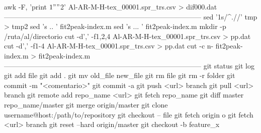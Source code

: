awk -F, '{print $1 " " $2}' Al-AR-M-H-tex_00001.spr_trs.csv > dif000.dat
------------------------------------------------------------------------------------
sed '1s/^.//' tmp > tmp2
sed 's ..  ' fit2peak-index.m
sed 's ...  ' fit2peak-index.m
mkdir -p /ruta/al/directorio
cut -d',' -f1,2,4 Al-AR-M-H-tex_00001.spr_trs.csv > pp.dat
cut -d',' -f1-4 Al-AR-M-H-tex_00001.spr_trs.csv > pp.dat
cut -c n- fit2peak-index.m > fit2peak-index.m
------------------------------------------------------------------------------------
git status
git log
git add file
git add .
git mv old_file new_file
git rm file
git rm -r folder
git commit -m "<comentario>"
git commit -a
git push <url> branch
git pull <url> branch
git remote add repo_name <url>
git fetch repo_name
git diff master repo_name/master
git merge origin/master
git clone username@host:/path/to/repository
git checkout -- file
git fetch origin o git fetch <url> branch
git reset --hard origin/master
git checkout -b feature_x
